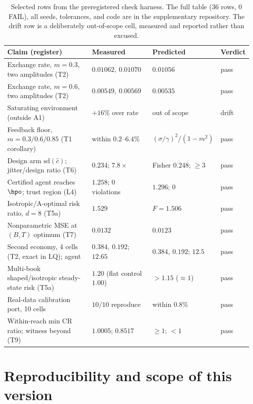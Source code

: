 \documentclass{article}
\begin{document}
\begin{table}[H]
\centering
\small
\caption{Selected rows from the preregistered check harness. The full table
(36 rows, 0 FAIL), all seeds, tolerances, and code are in the supplementary
repository. The drift row is a deliberately out-of-scope cell, measured and
reported rather than excused.}
\label{tab:results}
\begin{tabular}{@{}llll@{}}
\toprule
Claim (register) & Measured & Predicted & Verdict \\
\midrule
Exchange rate, $m{=}0.3$, two amplitudes (T2) & $0.01062,\ 0.01070$ & $0.01056$ & pass \\
Exchange rate, $m{=}0.6$, two amplitudes (T2) & $0.00549,\ 0.00569$ & $0.00535$ & pass \\
Saturating environment (outside A1) & $+16\%$ over rate & out of scope & drift \\
Feedback floor, $m{=}0.3/0.6/0.85$ (T1 corollary) & within $0.2$--$6.4\%$ & $(\sigma/\gamma)^2/(1{-}m^2)$ & pass \\
Design arm $\mathrm{sd}(\hat c)$; jitter/design ratio (T6) & $0.234$; $7.8\times$ & Fisher $0.248$; $\ge 3$ & pass \\
Certified agent reaches $\hpo$; trust region (L4) & $1.258$; $0$ violations & $1.296$; $0$ & pass \\
Isotropic/A-optimal risk ratio, $d{=}8$ (T5a) & $1.529$ & $F = 1.506$ & pass \\
Nonparametric MSE at $(B,T)$ optimum (T7) & $0.0132$ & $0.0123$ & pass \\
Second economy, 4 cells (T2, exact in LQ); agent & $0.384,\ 0.192$; $12.65$ & $0.384,\ 0.192$; $12.5$ & pass \\
Multi-book shaped/isotropic steady-state risk (T5a) & $1.20$ (flat control $1.00$) & $>1.15$ ($\approx 1$) & pass \\
Real-data calibration port, 10 cells & $10/10$ reproduce & within $0.8\%$ & pass \\
Within-reach min CR ratio; witness beyond (T9) & $1.0005$; $0.8517$ & $\ge 1$; $< 1$ & pass \\
\bottomrule
\end{tabular}
\end{table}

\section{Reproducibility and scope of this version}
\label{app:repro}
\end{document}
